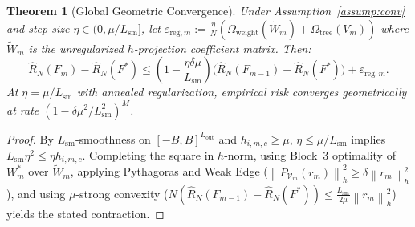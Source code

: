 \documentclass[11pt]{article}
\newtheorem{theorem}{Theorem}
\newcommand{\norm}[1]{\left\lVert #1 \right\rVert}
\begin{document}
\begin{theorem}[Global Geometric Convergence]
\label{thm:convergence}
Under Assumption~\ref{assump:conv} and step size $\eta \in (0, \mu / L_{\mathrm{sm}}]$, let $\varepsilon_{\mathrm{reg}, m} := \frac{\eta}{N}(\Omega_{\mathrm{weight}}(\tilde{W}_m) + \Omega_{\mathrm{tree}}(V_m))$ where $\tilde{W}_m$ is the unregularized $h$-projection coefficient matrix. Then:
\begin{equation}
    \hat{R}_N(F_m) - \hat{R}_N(F^*) \le \left(1 - \frac{\eta \delta \mu}{L_{\mathrm{sm}}}\right)\!\big(\hat{R}_N(F_{m-1}) - \hat{R}_N(F^*)\big) + \varepsilon_{\mathrm{reg}, m}.
\end{equation}
At $\eta = \mu / L_{\mathrm{sm}}$ with annealed regularization, empirical risk converges geometrically at rate $(1 - \delta \mu^2 / L_{\mathrm{sm}}^2)^M$.
\end{theorem}
\begin{proof}
By $L_{\mathrm{sm}}$-smoothness on $[-B,B]^{L_{\mathrm{out}}}$ and $h_{i,m,c} \ge \mu$, $\eta \le \mu/L_{\mathrm{sm}}$ implies $L_{\mathrm{sm}}\eta^2 \le \eta h_{i,m,c}$. Completing the square in $h$-norm, using Block~3 optimality of $W_m^*$ over $\tilde{W}_m$, applying Pythagoras and Weak Edge ($\norm{P_{\mathcal{V}_m}(r_m)}_h^2 \ge \delta\norm{r_m}_h^2$), and using $\mu$-strong convexity ($N(\hat{R}_N(F_{m-1}) - \hat{R}_N(F^*)) \le \frac{L_{\mathrm{sm}}}{2\mu}\norm{r_m}_h^2$) yields the stated contraction.
\end{proof}
\end{document}
